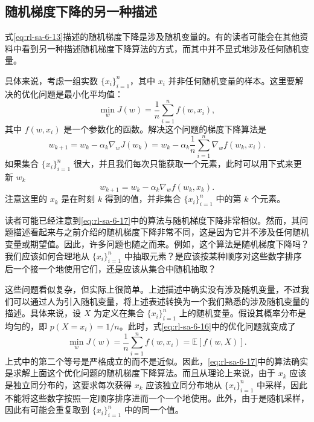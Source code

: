 \subsection{随机梯度下降的另一种描述}
\label{sec:rl-sa-sgd-alt}

式\eqref{eq:rl-sa-6-13}描述的随机梯度下降是涉及随机变量的。有的读者可能会在其他资料中看到另一种描述随机梯度下降算法的方式，而其中并不显式地涉及任何随机变量。

具体来说，考虑一组实数 $\{x_i\}_{i=1}^n$，其中 $x_i$ 并非任何随机变量的样本。这里要解决的优化问题是最小化平均值：
\begin{equation}
\min_w J(w) = \frac{1}{n} \sum_{i=1}^{n} f(w, x_i),
\label{eq:rl-sa-6-16}
\end{equation}
其中 $f(w, x_i)$ 是一个参数化的函数。解决这个问题的梯度下降算法是
\begin{equation}
w_{k+1} = w_k - \alpha_k \nabla_w J(w_k) = w_k - \alpha_k \frac{1}{n} \sum_{i=1}^{n} \nabla_w f(w_k, x_i).
\end{equation}
如果集合 $\{x_i\}_{i=1}^n$ 很大，并且我们每次只能获取一个元素，此时可以用下式来更新 $w_k$
\begin{equation}
w_{k+1} = w_k - \alpha_k \nabla_w f(w_k, x_k).
\label{eq:rl-sa-6-17}
\end{equation}
注意这里的 $x_k$ 是在时刻 $k$ 得到的值，并非集合 $\{x_i\}_{i=1}^n$ 中的第 $k$ 个元素。

读者可能已经注意到\eqref{eq:rl-sa-6-17}中的算法与随机梯度下降非常相似。然而，其问题描述看起来与之前介绍的随机梯度下降非常不同，这是因为它并不涉及任何随机变量或期望值。因此，许多问题也随之而来。例如，这个算法是随机梯度下降吗？我们应该如何合理地从 $\{x_i\}_{i=1}^n$ 中抽取元素？是应该按某种顺序对这些数字排序后一个接一个地使用它们，还是应该从集合中随机抽取？

这些问题看似复杂，但实际上很简单。上述描述中确实没有涉及随机变量，不过我们可以通过人为引入随机变量，将上述表述转换为一个我们熟悉的涉及随机变量的描述。具体来说，设 $X$ 为定义在集合 $\{x_i\}_{i=1}^n$ 上的随机变量。假设其概率分布是均匀的，即 $p(X = x_i) = 1/n$。此时，式\eqref{eq:rl-sa-6-16}中的优化问题就变成了
\begin{equation}
\min_w J(w) = \frac{1}{n} \sum_{i=1}^{n} f(w, x_i) = \mathbb{E}[f(w, X)].
\end{equation}
上式中的第二个等号是严格成立的而不是近似。因此，\eqref{eq:rl-sa-6-17}中的算法确实是求解上面这个优化问题的随机梯度下降算法。而且从理论上来说，由于 $x_k$ 应该是独立同分布的，这要求每次获得 $x_k$ 应该独立同分布地从 $\{x_i\}_{i=1}^n$ 中采样，因此不能将这些数字按照一定顺序排序进而一个一个地使用。此外，由于是随机采样，因此有可能会重复取到 $\{x_i\}_{i=1}^n$ 中的同一个值。

